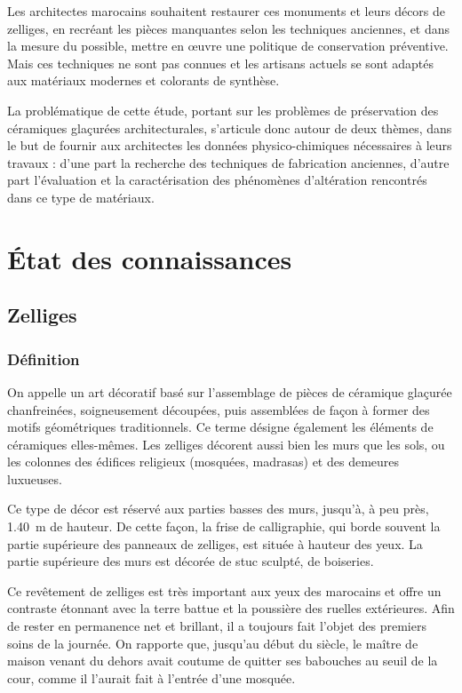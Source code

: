 Les architectes marocains souhaitent restaurer ces monuments et 
leurs décors de zelliges, en recréant les pièces manquantes selon 
les techniques anciennes, et dans la mesure du possible, mettre en 
{\oe}uvre une politique de conservation préventive. Mais ces 
techniques ne sont pas connues et les artisans actuels se sont 
adaptés aux matériaux modernes et colorants de synthèse.

La problématique de cette étude, portant sur les problèmes de 
préservation des céramiques glaçurées architecturales, s'articule 
donc autour de deux thèmes, dans le but de fournir aux architectes 
les données physico-chimiques nécessaires à leurs travaux : d'une 
part la recherche des techniques de fabrication anciennes, d'autre 
part l'évaluation et la caractérisation des phénomènes d'altération 
rencontrés dans ce type de matériaux.

\chapter{État des connaissances}

\section{Zelliges}

\subsection{Définition}
On appelle  un art décoratif basé sur l'assemblage 
de pièces de céramique glaçurée chanfreinées, soigneusement 
découpées, puis assemblées de façon à former des motifs géométriques 
traditionnels. Ce terme désigne également les éléments de céramiques 
elles-mêmes. Les zelliges décorent aussi bien les murs que les sols, 
ou les colonnes des édifices religieux (mosquées, madrasas) et des 
demeures luxueuses.

Ce type de décor est réservé aux parties basses des murs, jusqu'à, 
à peu près, \SI{1.40}{\m} de hauteur. De cette façon, la frise de 
calligraphie, qui borde souvent la partie supérieure des panneaux 
de zelliges, est située à hauteur des yeux. La partie supérieure 
des murs est décorée de stuc sculpté, de boiseries.

Ce revêtement de zelliges est très important aux yeux des marocains 
et offre un contraste étonnant avec la terre battue et la poussière 
des ruelles extérieures. Afin de rester en permanence net et brillant, 
il a toujours fait l'objet des premiers soins de la journée. On 
rapporte que, jusqu'au début du siècle, le maître de maison venant du 
dehors avait coutume de quitter ses babouches au seuil de la cour, 
comme il l'aurait fait à l'entrée d'une mosquée.

